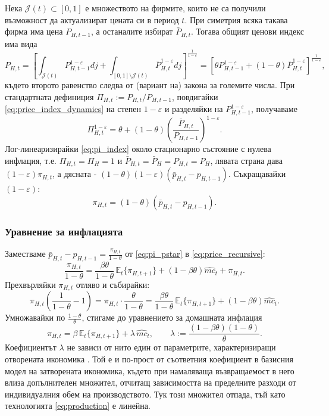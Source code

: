 Нека $\mathcal{J}(t) \subset [0,1]$ е множеството на фирмите, които не са получили възможност да актуализират цената си в период $t$. При симетрия всяка такава фирма има цена $P_{H,t-1}$, а останалите избират $\bar{P}_{H,t}$. Тогава общият ценови индекс има вида
\begin{equation}
P_{H,t} = \left[ \int_{\mathcal{J}(t)} P_{H,t-1}^{1-\varepsilon} dj + \int_{[0,1] \setminus \mathcal{J}(t)} \bar{P}_{H,t}^{1-\varepsilon} dj \right]^{\frac{1}{1-\varepsilon}}
= \left[ \theta P_{H,t-1}^{1-\varepsilon} + (1-\theta) \bar{P}_{H,t}^{1-\varepsilon} \right]^{\frac{1}{1-\varepsilon}},
\label{eq:price_index_dynamics}
\end{equation}
където второто равенство следва от (вариант на) закона за големите числа. При стандартната дефиниция $\Pi_{H,t} := P_{H,t}/P_{H,t-1}$, повдигайки \eqref{eq:price_index_dynamics} на степен $1-\varepsilon$ и разделяйки на $P_{H,t-1}^{1-\varepsilon}$, получаваме
\begin{equation}
\Pi_{H,t}^{1-\varepsilon} = \theta + (1-\theta) \left( \frac{\bar{P}_{H,t}}{P_{H,t-1}} \right)^{1-\varepsilon}.
\label{eq:pi_index}
\end{equation}
Лог-линеаризирайки \eqref{eq:pi_index} около стационарно състояние с нулева инфлация, т.е. $\Pi_{H,t} = \Pi_H = 1$ и $\bar{P}_{H,t} = \bar{P}_H = P_{H,t} = P_H$, лявата страна дава $(1-\varepsilon)\pi_{H,t}$, а дясната - $(1-\theta)(1-\varepsilon)(\bar{p}_{H,t} - p_{H,t-1})$. Съкращавайки $(1-\varepsilon)$:
\begin{equation}
\pi_{H,t} = (1-\theta)\left( \bar{p}_{H,t} - p_{H,t-1} \right).
\label{eq:pi_pstar}
\end{equation}

\subsubsection*{Уравнение за инфлацията}

Заместваме $\bar{p}_{H,t} - p_{H,t-1} = \frac{\pi_{H,t}}{1-\theta}$ от \eqref{eq:pi_pstar} в \eqref{eq:price_recursive}:
\[
\frac{\pi_{H,t}}{1-\theta} = \frac{\beta\theta}{1-\theta}\, \mathbb{E}_t\{\pi_{H,t+1}\} + (1-\beta\theta)\widehat{mc}_t + \pi_{H,t}.
\]
Прехвърляйки $\pi_{H,t}$ отляво и събирайки:
\[
\pi_{H,t}\left( \frac{1}{1-\theta} - 1 \right) = \pi_{H,t} \cdot \frac{\theta}{1-\theta}
= \frac{\beta\theta}{1-\theta}\, \mathbb{E}_t\{\pi_{H,t+1}\} + (1-\beta\theta)\widehat{mc}_t.
\]
Умножавайки по $\frac{1-\theta}{\theta}$, стигаме до уравнението за домашната инфлация
\begin{equation}
\pi_{H,t} = \beta\, \mathbb{E}_t\{ \pi_{H,t+1} \} + \lambda\, \widehat{mc}_t,
\qquad \lambda := \frac{(1-\beta\theta)(1-\theta)}{\theta}.
\label{eq:inflation_mc}
\end{equation}
Коефициентът $\lambda$ не зависи от нито един от параметрите, характеризиращи отворената икономика \parencite[с.~163]{Gali2008}. Той е и по-прост от съответния коефициент в базисния модел на затворената икономика, където при намаляваща възвращаемост в него влиза допълнителен множител, отчитащ зависимостта на пределните разходи от индивидуалния обем на производството. Тук този множител отпада, тъй като технологията \eqref{eq:production} е линейна.

